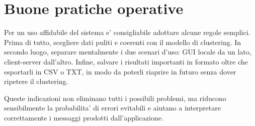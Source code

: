 \section{Buone pratiche operative}

Per un uso affidabile del sistema e' consigliabile adottare alcune regole semplici. Prima
di tutto, scegliere dati puliti e coerenti con il modello di clustering. In secondo
luogo, separare mentalmente i due scenari d'uso: GUI locale da un lato, client-server
dall'altro. Infine, salvare i risultati importanti in formato  oltre che
esportarli in CSV o TXT, in modo da poterli riaprire in futuro senza dover ripetere il clustering.

Queste indicazioni non eliminano tutti i possibili problemi, ma riducono sensibilmente la
probabilita' di errori evitabili e aiutano a interpretare correttamente i messaggi
prodotti dall'applicazione.
